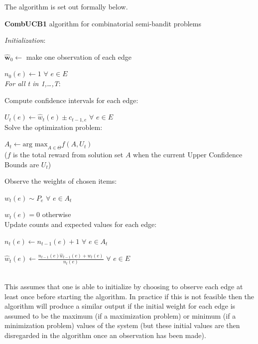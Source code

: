The algorithm is set out formally below.

\noindent \hrulefill

\noindent \textbf{CombUCB1} algorithm for combinatorial semi-bandit problems

\noindent \hrulefill

\noindent \textit{Initialization}:

$\mathbf{\hat{w}}_0 \leftarrow$ make one observation of each edge

$n_0(e) \leftarrow 1$ $\forall$ $e \in E$\\

\noindent \textit{For all t in 1,\ldots,T}:

Compute confidence intervals for each edge:

\indent \indent $U_t(e) \leftarrow \hat{w}_t(e)\pm c_{t-1,e}$ $\forall$ $e \in E$\\

Solve the optimization problem:

\indent \indent $A_t \leftarrow \textrm{arg max}_{A\in \Theta}f(A,U_t)$\\

($f$ is the total reward from solution set $A$ when the current Upper Confidence Bounds are $U_t$)

Observe the weights of chosen items:

\indent \indent $w_t(e) \sim P_e$ $\forall$ $e \in A_t$

\indent \indent $w_t(e)=0$ otherwise\\

Update counts and expected values for each edge:

\indent \indent $n_t(e) \leftarrow n_{t-1}(e) + 1$ $\forall$ $e \in A_t$

\indent \indent $\hat{w}_t(e) \leftarrow \frac{n_{t-1}(e)\hat{w}_{t-1}(e)+w_t(e)}{n_t(e)}$ $\forall$ $e \in E$

\noindent \hrulefill\\

This assumes that one is able to initialize by choosing to observe each edge at least once before starting the algorithm. In practice if this is not feasible then the algorithm will produce a similar output if the initial weight for each edge is assumed to be the maximum (if a maximization problem) or minimum (if a minimization problem) values of the system (but these initial values are then disregarded in the algorithm once an observation has been made).\\

